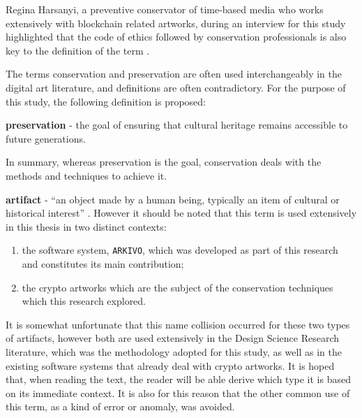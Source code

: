 \vspace{0.5cm}

Regina Harsanyi, a preventive conservator of time-based media who works extensively with blockchain related artworks, during an interview for this study highlighted that the code of ethics followed by conservation professionals is also key to the definition of the term \cite{americaninstitutefrorconservationCodeEthicsGuidelines}.

\vspace{0.5cm}

The terms conservation and preservation are often used interchangeably in the digital art literature, and definitions are often contradictory. For the purpose of this study, the following definition is proposed:

\vspace{0.5cm}
\textbf{preservation} - the goal of ensuring that cultural heritage remains accessible to future generations.

\vspace{0.5cm}

In summary, whereas preservation is the goal, conservation deals with the methods and techniques to achieve it.

\vspace{0.5cm}

\textbf{artifact} - ``an object made by a human being, typically an item of cultural or historical interest'' \cite{OxfordAdvancedLearner}. However it should be noted that this term is used extensively in this thesis in two distinct contexts:

\begin{enumerate}
    \item the software system, \texttt{ARKIVO}, which was developed as part of this research and constitutes its main contribution;
    \item the crypto artworks which are the subject of the conservation techniques which this research explored.
\end{enumerate}

\vspace{0.5cm}

It is somewhat unfortunate that this name collision occurred for these two types of artifacts, however both are used extensively in the Design Science Research literature, which was the methodology adopted for this study, as well as in the existing software systems that already deal with crypto artworks. It is hoped that, when reading the text, the reader will be able derive which type it is based on its immediate context. It is also for this reason that the other common use of this term, as a kind of error or anomaly, was avoided. 

